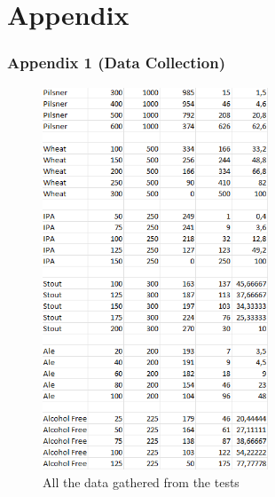 \section{Appendix}

\subsubsection{Appendix 1 (Data Collection)}

\begin{center}
    \centering
    \begin{figure}[H]
        \includegraphics[width=0.6\textwidth]{img/datacollection.png}
        \caption{All the data gathered from the tests}
        \label{fig:datacollection}
    \end{figure}
\end{center}

\newpage
